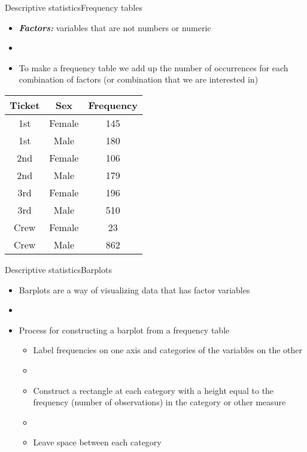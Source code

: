 \documentclass[xcolor=dvipsnames]{beamer}
\begin{document}
\begin{frame}{Descriptive statistics}{Frequency tables}
	\begin{itemize}
		\item \textbf{\emph{Factors:}} variables that are not numbers or numeric
		\item[]
		\item To make a frequency table we add up the number of occurrences for each combination of factors (or combination that we are interested in)
	\end{itemize}
\begin{center}
	\begin{tabular}{|c|c|c|}
		\hline
		\textbf{Ticket} & \textbf{Sex} & \textbf{Frequency} \\
		\hline \hline
		1st & Female & 145\\
		\hline
		1st &  Male & 180\\
		\hline
		2nd & Female & 106\\
		\hline
		2nd  & Male & 179\\
		\hline
		3rd & Female & 196\\
		\hline
		3rd  & Male & 510\\
		\hline
		Crew & Female &  23\\
		\hline
		Crew  & Male & 862\\
		\hline
	\end{tabular}
\end{center}
\end{frame}

\begin{frame}{Descriptive statistics}{Barplots}

\begin{itemize}
	\item Barplots are a way of visualizing data that has factor variables
	\item[]
	\item Process for constructing a barplot from a frequency table
		\begin{itemize}
		\item Label frequencies on one axis and categories of the variables on the other
		\item[] 
		\item Construct a rectangle at each category with a height equal to the frequency (number of observations) in the category or other measure
		\item[]
		\item Leave space between each category
	\end{itemize}
\end{itemize}
\end{frame}
\end{document}
